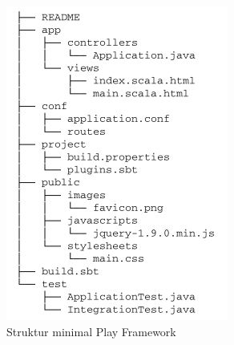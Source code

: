 \begin{figure}[htbp]
	\centering
		\includegraphics[scale=0.7]{Gambar/2_strukturplay.JPG}
	\caption{Struktur minimal Play Framework}
	\label{fig:2_strukturplay}
\end{figure}




